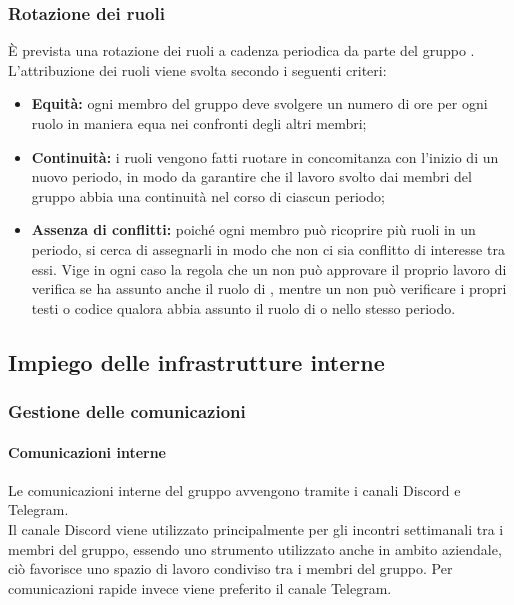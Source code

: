 \subsubsection{Rotazione dei ruoli}
È prevista una rotazione dei ruoli a cadenza periodica da parte del gruppo \groupName{}.\\
L'attribuzione dei ruoli viene svolta secondo i seguenti criteri:
\begin{itemize}
  \item \textbf{Equità:} ogni membro del gruppo deve svolgere un numero di ore per ogni ruolo in maniera equa nei confronti degli altri membri;
  \item \textbf{Continuità:} i ruoli vengono fatti ruotare in concomitanza con l'inizio di un nuovo periodo, in modo da garantire che il lavoro svolto dai membri del gruppo abbia una continuità nel corso di ciascun periodo;
  \item \textbf{Assenza di conflitti:} poiché ogni membro può ricoprire più ruoli in un periodo, si cerca di assegnarli in modo che non ci sia conflitto di interesse tra essi. Vige in ogni caso la regola che un \roleProjectManagerLow{} non può approvare il proprio lavoro di verifica se ha assunto anche il ruolo di \roleVerifierLow{}, mentre un \roleVerifierLow{} non può verificare i propri testi o codice qualora abbia assunto il ruolo di \roleAnalystLow{} o \roleProgrammerLow{} nello stesso periodo.
\end{itemize}
\vspace{2cm}

\subsection{Impiego delle infrastrutture interne} \label{subsection:infrastrutture_interne}

\subsubsection{Gestione delle comunicazioni}
\paragraph{Comunicazioni interne}
Le comunicazioni interne del gruppo \groupName{} avvengono tramite i canali Discord\glo{} e Telegram\glo{}.\\
Il canale Discord\glo{} viene utilizzato principalmente per gli incontri settimanali tra i membri del gruppo, essendo uno strumento utilizzato anche in ambito aziendale, ciò favorisce uno spazio di lavoro condiviso tra i membri del gruppo.
Per comunicazioni rapide invece viene preferito il canale Telegram\glo{}.

